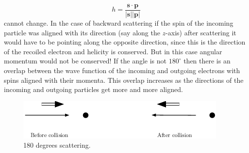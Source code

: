 \documentclass[12pt]{article}
\newcommand{\V}[1]{\mathbf{#1}}
\begin{document}
\[h=\frac{\V{s}\cdot\V{p}}{|\V{s}||\V{p}|}\]
cannot change. In the case of backward scattering if the spin of the incoming particle was aligned with its direction (say along the $z$-axis) after scattering it would have to be pointing along the opposite direction, since this is the direction of the recoiled electron and helicity is conserved. But in this case angular momentum would not be conserved! If the angle is not $180^\circ$ then there is an overlap between the wave function of the incoming and outgoing electrons with spins aligned with their momenta. This overlap increases as the directions of the incoming and outgoing particles get more and more aligned.
\begin{figure}
\begin{center}
\includegraphics[scale=0.7]{images/scattering180.png}
\caption{180 degrees scattering.}\label{fig:180deg}
\end{center}
\end{figure}
%
%
%
%
%
\end{document}
